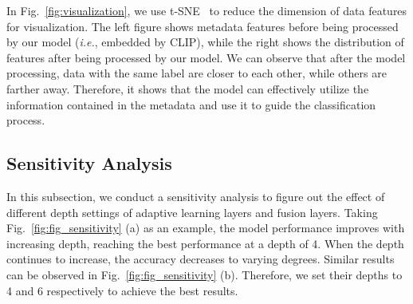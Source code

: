 
In Fig.~\ref{fig:visualization}, we use t-SNE~\cite{van2008visualizing} to reduce the dimension of data features for visualization.
The left figure shows metadata features before being processed by our model (\textit{i.e.}, embedded by CLIP), while the right shows the distribution of features after being processed by our model.
We can observe that after the model processing, data with the same label are closer to each other, while others are farther away.
Therefore, it shows that the model can effectively utilize the information contained in the metadata and use it to guide the classification process.

\subsection{Sensitivity Analysis}
% 
In this subsection, we conduct a sensitivity analysis to figure out the effect of different depth settings of adaptive learning layers and fusion layers. 
Taking Fig.~\ref{fig:fig_sensitivity} (a) as an example, the model performance improves with increasing depth, reaching the best performance at a depth of 4.
When the depth continues to increase, the accuracy decreases to varying degrees.
Similar results can be observed in Fig.~\ref{fig:fig_sensitivity} (b).
Therefore, we set their depths to 4 and 6 respectively to achieve the best results.



